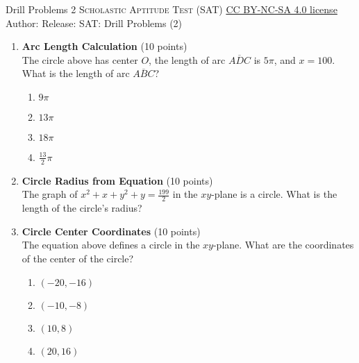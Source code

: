 \newpage\handout
{Drill Problems 2}
{\textsc{Scholastic Aptitude Test (SAT)}}
{\href{https://creativecommons.org/licenses/by-nc-sa/4.0/}{CC BY-NC-SA 4.0 license}}
{Author: \BookAuthor}{Release: \generatedOn}
{SAT: Drill Problems (2)}


\begin{enumerate}
  \item \textbf{Arc Length Calculation} (10 points)\\
  The circle above has center $O$, the length of arc $\overline{ADC}$ is $5\pi$, and $x=100$. What is the length of arc $\overline{ABC}$?
  \begin{enumerate}[label=(\Alph*)]
    \item $9\pi$
    \item $13\pi$
    \item $18\pi$
    \item $\frac{13}{2}\pi$
  \end{enumerate}
  \begin{subanswer}
  \end{subanswer}

  \item \textbf{Circle Radius from Equation} (10 points)\\
  The graph of $x^{2}+x+y^{2}+y=\frac{199}{2}$ in the $xy$-plane is a circle. What is the length of the circle's radius?
  \begin{subanswer}
  \end{subanswer}

  \item \textbf{Circle Center Coordinates} (10 points)\\
  The equation above defines a circle in the $xy$-plane. What are the coordinates of the center of the circle?
  \begin{enumerate}[label=(\Alph*)]
    \item $(-20,-16)$
    \item $(-10,-8)$
    \item $(10,8)$
    \item $(20,16)$
  \end{enumerate}
  \begin{subanswer}
  \end{subanswer}

  \newpage


\end{enumerate}
